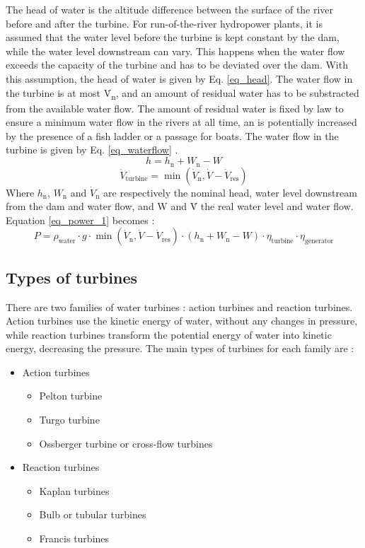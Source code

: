 The head of water is the altitude difference between the surface of the river before and after the turbine. For run-of-the-river hydropower plants, it is assumed that the water level before the turbine is kept constant by the dam, while the water level downstream can vary. This happens when the water flow exceeds the capacity of the turbine and has to be deviated over the dam. With this assumption, the head of water is given by Eq. \eqref{eq_head}. The water flow in the turbine is at most \.{V}\textsubscript{n}, and an amount of residual water has to be substracted from the available water flow. The amount of residual water is fixed by law to ensure a minimum water flow in the rivers at all time, an is potentially increased by the presence of a fish ladder or a passage for boats. The water flow in the turbine is given by Eq. \eqref{eq_waterflow} \cite{quaschning}.
\begin{equation}
\label{eq_head} 
 h = h_\mathrm{n} +W_\mathrm{n}-W
\end{equation}
\begin{equation}
\label{eq_waterflow} 
 \dot{V}_\mathrm{turbine} = \min(\dot{V}_\mathrm{n},\dot{V}-\dot{V}_\mathrm{res})
\end{equation}
Where $h_\mathrm{n}$, $W_\mathrm{n}$ and $\dot{V}_\mathrm{n}$ are respectively the nominal head, water level downstream from the dam and water flow, and W and \.{V} the real water level and water flow.
\newline
Equation \eqref{eq_power_1} becomes :
\begin{equation}
 \label{eq_power_2} 
 P = \rho_\mathrm{water} \cdot g \cdot \min(\dot{V}_\mathrm{n},\dot{V}-\dot{V}_\mathrm{res}) \cdot (h_\mathrm{n} +W_\mathrm{n}-W) \cdot \eta_\mathrm{turbine} \cdot \eta_\mathrm{generator}
\end{equation}

\subsection{Types of turbines}

There are two families of water turbines : action turbines and reaction turbines. Action turbines use the kinetic energy of water, without any changes in pressure, while reaction turbines transform the potential energy of water into kinetic energy, decreasing the pressure. The main types of turbines for each family are \cite{quaschning} :
\begin{itemize}
 \item Action turbines
 \begin{itemize}
  \item Pelton turbine
  \item Turgo turbine
  \item Ossberger turbine or cross-flow turbines
 \end{itemize}
 \item Reaction turbines
 \begin{itemize}
  \item Kaplan turbines
  \item Bulb or tubular turbines
  \item Francis turbines
 \end{itemize}
\end{itemize}

